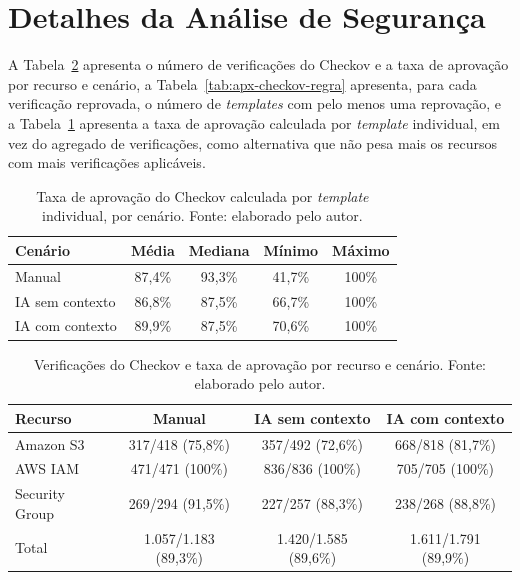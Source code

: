 \section{Detalhes da Análise de Segurança}
\label{apx:seguranca}

A Tabela~\ref{tab:apx-checkov-recurso} apresenta o número de verificações do Checkov e a taxa de aprovação por recurso e cenário, a Tabela~\ref{tab:apx-checkov-regra} apresenta, para cada verificação reprovada, o número de \textit{templates} com pelo menos uma reprovação, e a Tabela~\ref{tab:apx-checkov-template} apresenta a taxa de aprovação calculada por \textit{template} individual, em vez do agregado de verificações, como alternativa que não pesa mais os recursos com mais verificações aplicáveis.

\begin{table}[H]
\centering
\caption{Taxa de aprovação do Checkov calculada por \textit{template} individual, por cenário. Fonte: elaborado pelo autor.}
\label{tab:apx-checkov-template}
\small
\begin{tabular}{l|c|c|c|c}
\hline
\textbf{Cenário} & \textbf{Média} & \textbf{Mediana} & \textbf{Mínimo} & \textbf{Máximo} \\
\hline
Manual & 87,4\% & 93,3\% & 41,7\% & 100\% \\
IA sem contexto & 86,8\% & 87,5\% & 66,7\% & 100\% \\
IA com contexto & 89,9\% & 87,5\% & 70,6\% & 100\% \\
\hline
\end{tabular}
\end{table}

\begin{table}[H]
\centering
\caption{Verificações do Checkov e taxa de aprovação por recurso e cenário. Fonte: elaborado pelo autor.}
\label{tab:apx-checkov-recurso}
\small
\begin{tabular}{l|c|c|c}
\hline
\textbf{Recurso} & \textbf{Manual} & \textbf{IA sem contexto} & \textbf{IA com contexto} \\
\hline
Amazon S3 & 317/418 (75,8\%) & 357/492 (72,6\%) & 668/818 (81,7\%) \\
AWS IAM & 471/471 (100\%) & 836/836 (100\%) & 705/705 (100\%) \\
Security Group & 269/294 (91,5\%) & 227/257 (88,3\%) & 238/268 (88,8\%) \\
\hline
Total & 1.057/1.183 (89,3\%) & 1.420/1.585 (89,6\%) & 1.611/1.791 (89,9\%) \\
\hline
\end{tabular}
\end{table}

